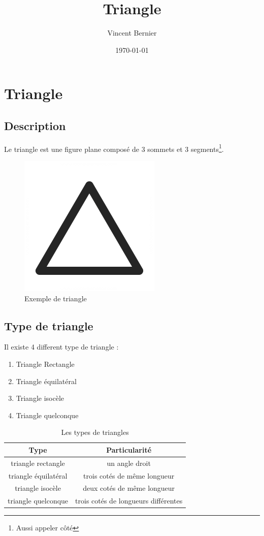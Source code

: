 \documentclass{article}
\title{Triangle}
\author{Vincent Bernier}
\date{\today}
\begin{document}
\maketitle
\newpage
\tableofcontents
\listoffigures
\listoftables
\newpage



\section{Triangle}
    \subsection{Description}
    Le triangle est une figure plane composé de 3 sommets et 3 segments\footnote{Aussi appeler côté}.
    \begin{figure}[h]
        \centering
        \includegraphics[scale=0.5]{triangle.png}
        \caption{Exemple de triangle}
        \label{Triangle}
    \end{figure}
    \subsection{Type de triangle}
    Il existe 4 different type de triangle :
    \begin{enumerate}
        \item Triangle Rectangle
        \item Triangle équilatéral
        \item Triangle isocèle
        \item Triangle quelconque
    \end{enumerate}
    \begin{table}[h]
    \centering
    \begin{tabular}{c|c}
    Type & Particularité \\ \hline
        triangle rectangle & un angle droit \\
        triangle équilatéral & trois cotés de même longueur \\
        triangle isocèle & deux cotés de même longueur \\
        triangle quelconque & trois cotés de longueurs différentes \\
    \end{tabular}        
    \caption{Les types de triangles}
    \label{tab:my_label}
\end{table}
\end{document}
